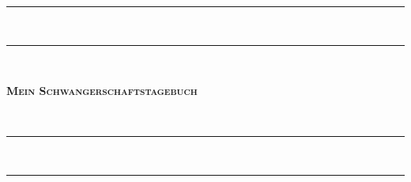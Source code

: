 {\begingroup
\iftablet
{} %
\else
{} %
\fi
\noindent
\hspace{-8mm}\parbox{12cm}{\rule{10cm}{1.6pt}\vspace*{-\baselineskip}\vspace*{2pt}\\ %
\rule{10cm}{0.4pt}\\[0.2\baselineskip] %
\parbox[c][2cm]{10cm}{\centering\textsc{\LARGE \textbf{Mein Schwangerschaftstagebuch}}\par}\\ %

 \noindent\rule{10cm}{0.4pt}\vspace*{-\baselineskip}\vspace{3.2pt}\\ %
\rule{10cm}{1.6pt}}\\[\baselineskip] %
\endgroup}
\cleardoublepage
